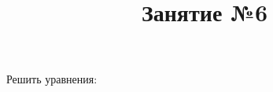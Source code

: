 \newpage
\title{Занятие №6}
\begin{listofex}
	\item {}
	\item Решить уравнения:
	\begin{enumcols}[itemcolumns=2]
		\item {}
		\item {}
	\end{enumcols}
	
\end{listofex}
%	
%	
%	
%	
%	

